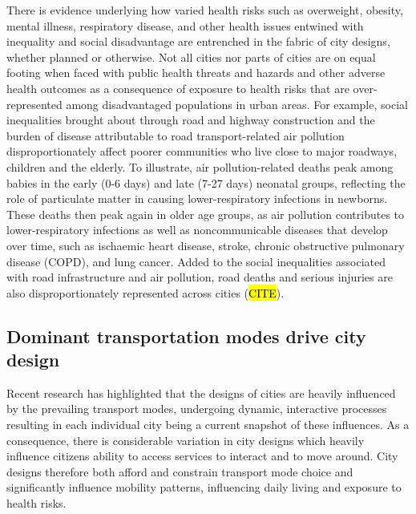 \documentclass[preprint,10pt]{elsarticle} %
\begin{document}
There is evidence underlying how varied health risks such as overweight, obesity, mental illness, respiratory disease, and other health issues entwined with inequality and social disadvantage are entrenched in the fabric of city designs, whether planned or otherwise\cite{borrell2013factors,xing2016impact,yuchi2020road}. Not all cities nor parts of cities are on equal footing when faced with public health threats and hazards and other adverse health outcomes as a consequence of exposure to health risks that are over-represented among disadvantaged populations in urban areas\cite{KRISHNA2021102046}. For example, social inequalities brought about through road and highway construction\cite{carpenter2010poverty,archer2020white} and the burden of disease attributable to road transport-related air pollution disproportionately affect poorer communities who live close to major roadways, children and the elderly. To illustrate, air pollution-related deaths peak among babies in the early (0-6 days) and late (7-27 days) neonatal groups, reflecting the role of particulate matter in causing lower-respiratory infections in newborns. These deaths then peak again in older age groups, as air pollution contributes to lower-respiratory infections as well as noncommunicable diseases that develop over time, such as ischaemic heart disease, stroke, chronic obstructive pulmonary disease (COPD), and lung cancer\cite{boogaard2022long}. Added to the social inequalities associated with road infrastructure and air pollution, road deaths and serious injuries are also disproportionately represented across cities (\hl{CITE}).

\subsection*{Dominant transportation modes drive city design}
Recent research has highlighted that the designs of cities are heavily influenced by the prevailing transport modes\cite{KNOWLES2020102607}, undergoing dynamic, interactive processes \cite{Strano2012} resulting in each individual city being a current snapshot of these influences. As a consequence, there is considerable variation in city designs which heavily influence citizens ability to access services to interact and to move around\cite{Thompson2020}. City designs therefore both afford and constrain transport mode choice and significantly influence mobility patterns, influencing daily living and exposure to health risks\cite{WHO2023}.
\end{document}
